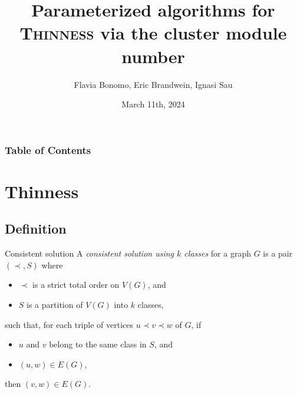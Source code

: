 \documentclass{beamer}
\title[Param. algorithms for \text{Thinness} via the cluster module number]{Parameterized algorithms for \textsc{Thinness} via the cluster module number}
\author{Flavia Bonomo, Eric Brandwein, Ignasi Sau}
\institute{Group: Graph Theory and Combinatorial Optimization}
\date{March 11th, 2024}
\begin{document}

\frame{\titlepage}


\begin{frame}
    \frametitle{Table of Contents}
    \tableofcontents[hideallsubsections]
\end{frame}

\section{Thinness}
\subsection{Definition}
\begin{frame}{Consistent solution}
    A \emph{consistent solution using $k$ classes} for a graph $G$ is a pair $(\prec, S)$ where 
    \begin{itemize}
        \item $\prec$ is a strict total order on $V(G)$, and 
        \item $S$ is a partition of $V(G)$ into $k$ classes,
    \end{itemize}
    such that, for each triple of vertices $u\prec v \prec w$ of $G$, if
    \begin{itemize}
        \item $u$ and $v$ belong to the same class in $S$, and
        \item $(u,w) \in E(G)$,
    \end{itemize}
    then $(v,w) \in E(G)$.
\end{frame}
\end{document}
